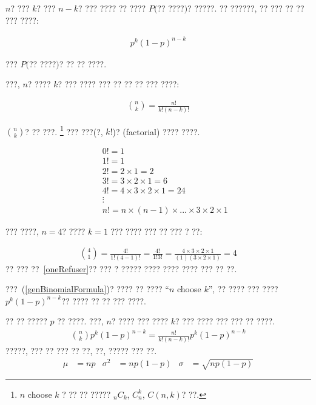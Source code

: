 $n$? ??? $k$? ??? $n-k$? ??? ???? ?? ???? $P($?? ????$)$? ?????. ?? ??????, ?? ??? ?? ?? ??? ????:

\begin{eqnarray*}
p^k(1-p)^{n-k}
\end{eqnarray*}

??? $P($?? ????$)$? ?? ?? ????.

???, $n$? ???? $k$? ??? ???? ??? ?? ?? ?? ??? ????:

\begin{eqnarray*}
{n\choose k} = \frac{n!}{k!(n-k)!}
\end{eqnarray*}

${n\choose k}$?  ?? ???. \footnote{$n$ choose $k$ ? ?? ?? ????? $_nC_k$, $C_n^k$, $C(n,k)$? ??.} ??? ???(?, $k!$)? (factorial)\label{factorialDefinitionInTheBinomialSection} ???? ????.

\begin{eqnarray*}
&& 0! = 1 \label{zeroFactorial} \\
&& 1! = 1 \\
&& 2! = 2\times1 = 2 \\
&& 3! = 3\times2\times1 = 6 \\
&& 4! = 4\times3\times2\times1 = 24 \\
&& \vdots \\
&& n! = n\times(n-1)\times...\times3\times2\times1
\end{eqnarray*}

??? ????, $n=4$? ???? $k=1$ ??? ???? ??? ?? ??? ? ??:  

\begin{eqnarray*}
{4 \choose 1} = \frac{4!}{1!(4-1)!} =  \frac{4!}{1!3!} 
	= \frac{4\times3\times2\times1}{(1)(3\times2\times1)} = 4
\end{eqnarray*}
?? ??? ??~\ref{oneRefuser}?? ??? ? ????? ???? ???? ???? ??? ?? ??.

???~(\ref{genBinomialFormula})? ???? ?? ???? ``$n$ choose $k$'', ?? ???? ??? ???? $p^k(1-p)^{n-k}$?? ???? ?? ?? ??? ????.

\begin{termBox}{ 
?? ?? ????? $p$ ?? ????. ???, $n$? ???? ??? ???? $k$? ??? ???? ??? ??? ?? ????.\vspace{-1mm}
\begin{eqnarray}
{n\choose k}p^k(1-p)^{n-k} = \frac{n!}{k!(n-k)!}p^k(1-p)^{n-k}
\label{binomialFormula}
\end{eqnarray}
?????, ??? ?? ??? ?? ??, ??, ????? ??? ??. \vspace{-2mm}
\begin{align}
\mu &= np
	&\sigma^2 &= np(1-p)
	&\sigma &= \sqrt{np(1-p)}
\label{binomialStats}
\end{align}}
\end{termBox}


